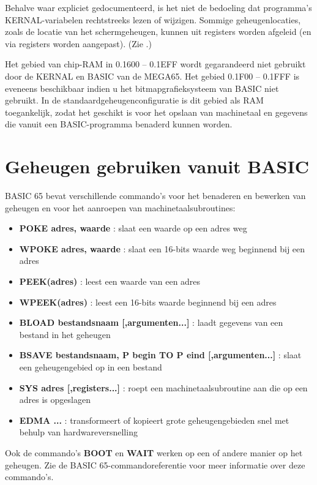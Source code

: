 Behalve waar expliciet gedocumenteerd, is het niet de bedoeling dat programma's KERNAL-variabelen rechtstreeks lezen of wijzigen. Sommige geheugenlocaties, zoals de locatie van het schermgeheugen, kunnen uit registers worden afgeleid (en via registers worden aangepast). (Zie .)

Het gebied van chip-RAM in 0.1600 -- 0.1EFF wordt gegarandeerd niet gebruikt door de KERNAL en BASIC van de MEGA65. Het gebied 0.1F00 -- 0.1FFF is eveneens beschikbaar indien u het bitmapgrafieksysteem van BASIC niet gebruikt. In de standaardgeheugenconfiguratie is dit gebied als RAM toegankelijk, zodat het geschikt is voor het opslaan van machinetaal en gegevens die vanuit een BASIC-programma benaderd kunnen worden.


\newpage
\section{Geheugen gebruiken vanuit BASIC}

BASIC 65 bevat verschillende commando's voor het benaderen en bewerken van geheugen en voor het aanroepen van machinetaalsubroutines:

\begin{itemize}
\item {\bf POKE adres, waarde} : slaat een waarde op een adres weg\item {\bf WPOKE adres, waarde} : slaat een 16-bits waarde weg beginnend bij een adres\item {\bf PEEK(adres)} : leest een waarde van een adres\item {\bf WPEEK(adres)} : leest een 16-bits waarde beginnend bij een adres\item {\bf BLOAD bestandsnaam [,argumenten...]} : laadt gegevens van een bestand in het geheugen\item {\bf BSAVE bestandsnaam, P begin TO P eind [,argumenten...]} : slaat een geheugengebied op in een bestand\item {\bf SYS adres [,registers...]} : roept een machinetaalsubroutine aan die op een adres is opgeslagen\item {\bf EDMA ...} : transformeert of kopieert grote geheugengebieden snel met behulp van hardwareversnelling
\end{itemize}

Ook de commando's {\bf BOOT} en {\bf WAIT} werken op een of andere manier op het geheugen. Zie de BASIC 65-commandoreferentie voor meer informatie over deze commando's.

